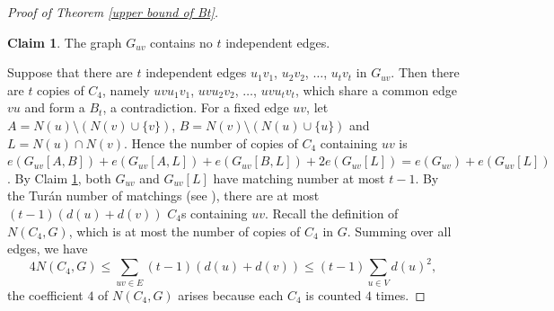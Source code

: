 \documentclass[11pt,a4paper]{article}
\theoremstyle{definition}
\newtheorem{claimthm}{Claim}[section]
\newenvironment{claimproof}
  {\renewcommand{\qedsymbol}{\ensuremath{\blacksquare}}\proof}
  {\endproof}
  {\endproof}
\begin{document}
\begin{proof}[Proof of Theorem \ref{upper bound of Bt}]
            \begin{claimthm}\label{cla: 315}
                The graph $G_{uv}$ contains no $t$ independent edges.
            \end{claimthm}
            \begin{claimproof}
                Suppose that there are $t$ independent edges $u_1 v_1$, $u_2 v_2$, $\dots$, $u_t v_t$ in $G_{uv}$.
                Then there are $t$ copies of $C_4$, namely $uv u_1 v_1$, $uv u_2 v_2$, $\dots$, $uv u_t v_t$, which share a common edge $vu$ and form a $B_t$, a contradiction.
            \end{claimproof}
            For a fixed edge $uv$, let $A = N(u) \setminus (N(v) \cup \{v\})$, $B = N(v) \setminus (N(u) \cup \{u\})$ and $L = N(u) \cap N(v)$.
            Hence the number of copies of $C_4$ containing $uv$ is $e(G_{uv}[A, B]) + e(G_{uv}[A, L]) + e(G_{uv}[B, L]) + 2e(G_{uv}[L]) = e(G_{uv}) + e(G_{uv}[L])$.
            By Claim \ref{cla: 315}, both $G_{uv}$ and $G_{uv}[L]$ have matching number at most $t-1$.            
            By the Tur\'{a}n number of matchings (see \cite{ErdosOn1959}), 
            there are at most $(t-1) (d(u) + d(v))$ $C_4$s containing $uv$.
            Recall the definition of $N(C_4, G)$, which is at most the number of copies of $C_4$ in $G$.
            Summing over all edges, we have
            \begin{equation*}
                4 N(C_4, G) \leq \sum_{uv \in E} (t-1) (d(u) + d(v)) \leq (t-1) \sum_{u \in V} d(u)^2,
            \end{equation*}
            the coefficient $4$ of $N(C_4, G)$ arises because each $C_4$ is counted $4$ times.



\end{proof}
\end{document}

